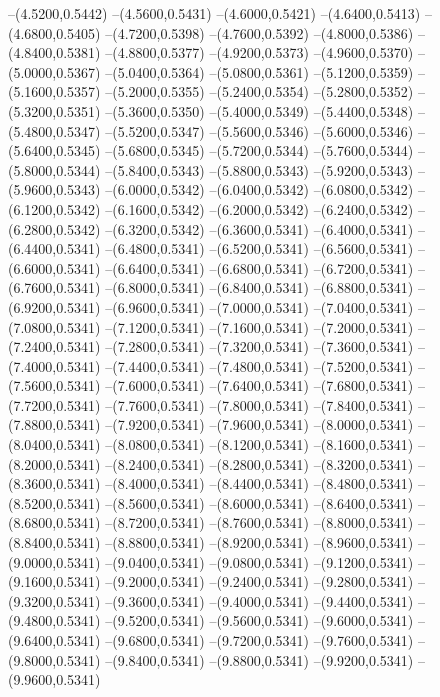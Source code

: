 {	--(4.5200,0.5442)
	--(4.5600,0.5431)
	--(4.6000,0.5421)
	--(4.6400,0.5413)
	--(4.6800,0.5405)
	--(4.7200,0.5398)
	--(4.7600,0.5392)
	--(4.8000,0.5386)
	--(4.8400,0.5381)
	--(4.8800,0.5377)
	--(4.9200,0.5373)
	--(4.9600,0.5370)
	--(5.0000,0.5367)
	--(5.0400,0.5364)
	--(5.0800,0.5361)
	--(5.1200,0.5359)
	--(5.1600,0.5357)
	--(5.2000,0.5355)
	--(5.2400,0.5354)
	--(5.2800,0.5352)
	--(5.3200,0.5351)
	--(5.3600,0.5350)
	--(5.4000,0.5349)
	--(5.4400,0.5348)
	--(5.4800,0.5347)
	--(5.5200,0.5347)
	--(5.5600,0.5346)
	--(5.6000,0.5346)
	--(5.6400,0.5345)
	--(5.6800,0.5345)
	--(5.7200,0.5344)
	--(5.7600,0.5344)
	--(5.8000,0.5344)
	--(5.8400,0.5343)
	--(5.8800,0.5343)
	--(5.9200,0.5343)
	--(5.9600,0.5343)
	--(6.0000,0.5342)
	--(6.0400,0.5342)
	--(6.0800,0.5342)
	--(6.1200,0.5342)
	--(6.1600,0.5342)
	--(6.2000,0.5342)
	--(6.2400,0.5342)
	--(6.2800,0.5342)
	--(6.3200,0.5342)
	--(6.3600,0.5341)
	--(6.4000,0.5341)
	--(6.4400,0.5341)
	--(6.4800,0.5341)
	--(6.5200,0.5341)
	--(6.5600,0.5341)
	--(6.6000,0.5341)
	--(6.6400,0.5341)
	--(6.6800,0.5341)
	--(6.7200,0.5341)
	--(6.7600,0.5341)
	--(6.8000,0.5341)
	--(6.8400,0.5341)
	--(6.8800,0.5341)
	--(6.9200,0.5341)
	--(6.9600,0.5341)
	--(7.0000,0.5341)
	--(7.0400,0.5341)
	--(7.0800,0.5341)
	--(7.1200,0.5341)
	--(7.1600,0.5341)
	--(7.2000,0.5341)
	--(7.2400,0.5341)
	--(7.2800,0.5341)
	--(7.3200,0.5341)
	--(7.3600,0.5341)
	--(7.4000,0.5341)
	--(7.4400,0.5341)
	--(7.4800,0.5341)
	--(7.5200,0.5341)
	--(7.5600,0.5341)
	--(7.6000,0.5341)
	--(7.6400,0.5341)
	--(7.6800,0.5341)
	--(7.7200,0.5341)
	--(7.7600,0.5341)
	--(7.8000,0.5341)
	--(7.8400,0.5341)
	--(7.8800,0.5341)
	--(7.9200,0.5341)
	--(7.9600,0.5341)
	--(8.0000,0.5341)
	--(8.0400,0.5341)
	--(8.0800,0.5341)
	--(8.1200,0.5341)
	--(8.1600,0.5341)
	--(8.2000,0.5341)
	--(8.2400,0.5341)
	--(8.2800,0.5341)
	--(8.3200,0.5341)
	--(8.3600,0.5341)
	--(8.4000,0.5341)
	--(8.4400,0.5341)
	--(8.4800,0.5341)
	--(8.5200,0.5341)
	--(8.5600,0.5341)
	--(8.6000,0.5341)
	--(8.6400,0.5341)
	--(8.6800,0.5341)
	--(8.7200,0.5341)
	--(8.7600,0.5341)
	--(8.8000,0.5341)
	--(8.8400,0.5341)
	--(8.8800,0.5341)
	--(8.9200,0.5341)
	--(8.9600,0.5341)
	--(9.0000,0.5341)
	--(9.0400,0.5341)
	--(9.0800,0.5341)
	--(9.1200,0.5341)
	--(9.1600,0.5341)
	--(9.2000,0.5341)
	--(9.2400,0.5341)
	--(9.2800,0.5341)
	--(9.3200,0.5341)
	--(9.3600,0.5341)
	--(9.4000,0.5341)
	--(9.4400,0.5341)
	--(9.4800,0.5341)
	--(9.5200,0.5341)
	--(9.5600,0.5341)
	--(9.6000,0.5341)
	--(9.6400,0.5341)
	--(9.6800,0.5341)
	--(9.7200,0.5341)
	--(9.7600,0.5341)
	--(9.8000,0.5341)
	--(9.8400,0.5341)
	--(9.8800,0.5341)
	--(9.9200,0.5341)
	--(9.9600,0.5341)
}
